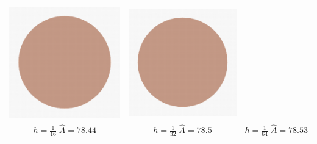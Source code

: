\begin{frame}
\begin{tabular}{ccc}
\includegraphics[scale=0.2]{figures/motivation/digital-geometric-estimators/multigrid/h003125.png} &
\includegraphics[scale=0.2]{figures/motivation/digital-geometric-estimators/multigrid/h003125.png} \\
$h=\frac{1}{16}\; \hat{A}=78.44$ & $h=\frac{1}{32}\; \hat{A}=78.5$ & $h=\frac{1}{64}\; \hat{A}=78.53$
\end{tabular}

\end{frame}

